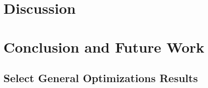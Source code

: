 \documentclass[10pt]{article}
\begin{document}
\section{Discussion}


\section{Conclusion and Future Work}


\pagebreak




\pagebreak
\begin{appendices}

\section{Select General Optimizations Results}
\label{appendix:general-optimizations-results}

\end{appendices}
\end{document}
